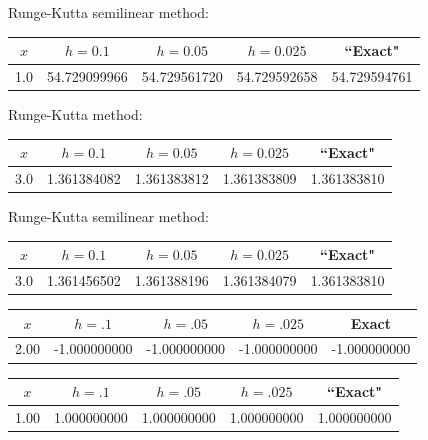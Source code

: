 \hspace{.75in}
{\small Runge-Kutta semilinear method:
\begin{tabular}{|c|r|r|r|r|}
\hline
\multicolumn{1}{|c|}{$x$}&
\multicolumn{1}{|c|}{$h=0.1$}&
\multicolumn{1}{|c|}{$h=0.05$}&
\multicolumn{1}{|c|}{$h=0.025$}&
\multicolumn{1}{|c|}{``Exact"}\\ \hline
1.0 & 54.729099966 & 54.729561720 & 54.729592658 & 54.729594761 \\
\hline
\end{tabular}}\bigskip

{\small Runge-Kutta method:
\begin{tabular}{|c|r|r|r|r|}
\hline
\multicolumn{1}{|c|}{$x$}&
\multicolumn{1}{|c|}{$h=0.1$}&
\multicolumn{1}{|c|}{$h=0.05$}&
\multicolumn{1}{|c|}{$h=0.025$}&
\multicolumn{1}{|c|}{``Exact"}\\ \hline
3.0 & 1.361384082 & 1.361383812 & 1.361383809 & 1.361383810 \\
\hline
\end{tabular}}\bigskip


\hspace{.75in}
{\small Runge-Kutta semilinear method:
\begin{tabular}{|c|r|r|r|r|}
\hline
\multicolumn{1}{|c|}{$x$}&
\multicolumn{1}{|c|}{$h=0.1$}&
\multicolumn{1}{|c|}{$h=0.05$}&
\multicolumn{1}{|c|}{$h=0.025$}&
\multicolumn{1}{|c|}{``Exact"}\\ \hline
3.0 & 1.361456502 & 1.361388196 & 1.361384079 & 1.361383810 \\
\hline
\end{tabular}}\bigskip

{\small
{}
\begin{tabular}{|r|r|r|r|r|}
\hline
\multicolumn{1}{|c|}{$x$}&
\multicolumn{1}{|c|}{$h=.1$}&
\multicolumn{1}{|c|}{$h=.05$}&
\multicolumn{1}{|c|}{$h=.025$}&
\multicolumn{1}{|c|}{Exact}\\ \hline
2.00  & -1.000000000 & -1.000000000 & -1.000000000 & -1.000000000 \\
\hline
\end{tabular}}\bigskip

{\small
{}
\begin{tabular}{|r|r|r|r|r|}
\hline
\multicolumn{1}{|c|}{$x$}&
\multicolumn{1}{|c|}{$h=.1$}&
\multicolumn{1}{|c|}{$h=.05$}&
\multicolumn{1}{|c|}{$h=.025$}&
\multicolumn{1}{|c|}{``Exact"}\\ \hline
1.00  & 1.000000000 &  1.000000000 &  1.000000000  & 1.000000000 \\
\hline
\end{tabular}}\bigskip

